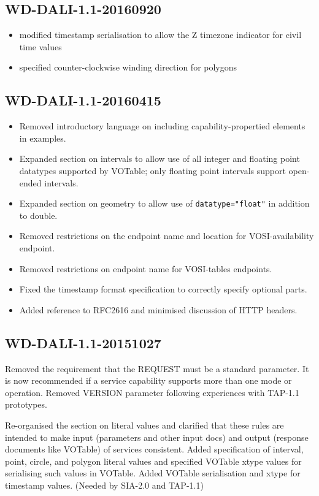\documentclass[11pt,letter]{ivoa}
\begin{document}
\subsection{WD-DALI-1.1-20160920}

\begin{itemize}
\item modified timestamp serialisation to allow the Z timezone indicator for
civil time values
\item specified counter-clockwise winding direction for polygons
\end{itemize}

\subsection{WD-DALI-1.1-20160415}

\begin{itemize}
\item Removed introductory language on including capability-propertied elements in
examples.
\item Expanded section on intervals to allow use of all integer and floating point datatypes
supported by VOTable; only floating point intervals support open-ended intervals.
\item Expanded section on geometry to allow use of \verb|datatype="float"| in addition to double.
\item Removed restrictions on the endpoint name and location for VOSI-availability endpoint.
\item Removed restrictions on endpoint name for VOSI-tables endpoints.
\item Fixed the timestamp format specification to correctly specify optional parts.
\item Added reference to RFC2616 and minimised discussion of HTTP headers.
\end{itemize}

\subsection{WD-DALI-1.1-20151027}

Removed the requirement that the REQUEST must be a standard parameter. It is
now recommended if a service capability supports more than one mode or
operation. Removed VERSION parameter following experiences with TAP-1.1
prototypes.

Re-organised the section on literal values and clarified that these rules
are intended to make input (parameters and other input docs) and output
(response documents like VOTable) of services consistent. Added specification
of interval, point, circle, and polygon literal values and specified VOTable
xtype values for serialising such values in VOTable. Added VOTable serialisation
and xtype for timestamp values. (Needed by SIA-2.0 and TAP-1.1)
\end{document}
